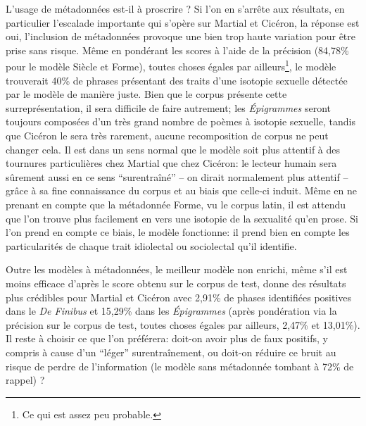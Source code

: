 L'usage de métadonnées est-il à proscrire ? Si l'on en s'arrête aux résultats, en particulier l'escalade importante qui s'opère sur Martial et Cicéron, la réponse est oui, l'inclusion de métadonnées provoque une bien trop haute variation pour être prise sans risque. Même en pondérant les scores à l'aide de la précision (84,78\% pour le modèle Siècle et Forme), toutes choses égales par ailleurs\footnote{Ce qui est assez peu probable.}, le modèle trouverait 40\% de phrases présentant des traits d'une isotopie sexuelle détectée par le modèle de manière juste. Bien que le corpus présente cette surreprésentation, il sera difficile de faire autrement; les \textit{Épigrammes} seront toujours composées d'un très grand nombre de poèmes à isotopie sexuelle, tandis que Cicéron le sera très rarement, aucune recomposition de corpus ne peut changer cela. Il est dans un sens normal que le modèle soit plus attentif à des tournures particulières chez Martial que chez Cicéron: le lecteur humain sera sûrement aussi en ce sens \enquote{surentraîné} -- on dirait normalement plus attentif -- grâce à sa fine connaissance du corpus et au biais que celle-ci induit. Même en ne prenant en compte que la métadonnée Forme, vu le corpus latin, il est attendu que l'on trouve plus facilement en vers une isotopie de la sexualité qu'en prose. Si l'on prend en compte ce biais, le modèle fonctionne: il prend bien en compte les particularités de chaque trait idiolectal ou sociolectal qu'il identifie.

Outre les modèles à métadonnées, le meilleur modèle non enrichi, même s'il est moins efficace d'après le score obtenu sur le corpus de test, donne des résultats plus crédibles pour Martial et Cicéron avec 2,91\% de phases identifiées positives dans le \textit{De Finibus} et 15,29\% dans les \textit{Épigrammes} (après pondération via la précision sur le corpus de test, toutes choses égales par ailleurs, 2,47\% et 13,01\%). Il reste à choisir ce que l'on préférera: doit-on avoir plus de faux positifs, y compris à cause d'un \enquote{léger} surentraînement, ou doit-on réduire ce bruit au risque de perdre de l'information (le modèle sans métadonnée tombant à 72\% de rappel) ? 


